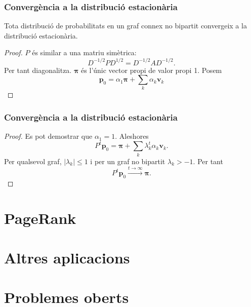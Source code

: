 \documentclass[aspectratio=169, 12pt]{beamer}
\renewcommand{\vec}[1]{\mathbf{\bm #1}}
\newcommand{\abs}[1]{\left\lvert #1 \right\rvert}
\begin{document}
\begin{frame}
	\frametitle{Convergència a la distribució estacionària}
	\begin{theorem}
		Tota distribució de probabilitats en un graf connex no bipartit convergeix a la distribució estacionària. 
	\end{theorem}
	\pause
	\begin{proof}
\( P \) és similar a una matriu simètrica:
\[ D^{-1/2}PD^{1/2} = D^{-1/2}AD^{-1/2}. \] \pause
Per tant diagonalitza. \pause
\( \vec{\pi} \) és l'únic vector propi de valor propi 1. Posem \[ \vec{p}_0 = \alpha_1 \vec{\pi} + \sum_k \alpha_k \vec{v}_k \]
\end{proof}
\end{frame}

\begin{frame}
	\frametitle{Convergència a la distribució estacionària}
	\begin{proof}
		Es pot demostrar que \( \alpha_1 = 1 \). \pause Aleshores
		\begin{equation*}
			P^t \vec{p}_0 = \vec{\pi} + \sum_k \lambda_k^t \alpha_k \vec{v}_k. 
		\end{equation*} \pause
		Per qualsevol graf, \( \abs{\lambda_k} \leq 1 \) i per un graf no bipartit \( \lambda_k > -1 \). \pause Per tant 
		\begin{equation*}
			P^t \vec{p}_0 \xrightarrow{t \to \infty} \vec{\pi}.
		\end{equation*}
	\end{proof}
\end{frame}

\section{PageRank}

\section{Altres aplicacions}

\section{Problemes oberts}
\end{document}
